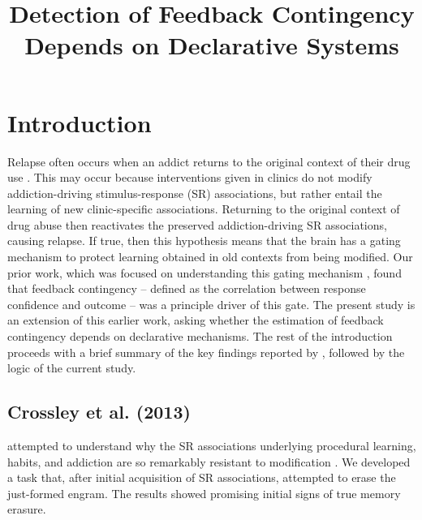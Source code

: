 \documentclass[man,apacite,draftfirst]{apa6} \usepackage{amsmath}
\title{Detection of Feedback Contingency Depends on Declarative Systems}
\begin{document}
\maketitle

\section*{Introduction}
Relapse often occurs when an addict returns to the original context of their
drug use \cite{higgins_outpatient_1995}. This may occur because interventions
given in clinics do not modify addiction-driving stimulus-response (SR)
associations, but rather entail the learning of new clinic-specific
associations. Returning to the original context of drug abuse then reactivates
the preserved addiction-driving SR associations, causing relapse. If true, then
this hypothesis means that the brain has a gating mechanism to protect learning
obtained in old contexts from being modified. Our prior work, which was focused
on understanding this gating mechanism \cite{crossley_erasing_2013}, found that
feedback contingency -- defined as the correlation between response confidence
and outcome -- was a principle driver of this gate. The present study is an
extension of this earlier work, asking whether the estimation of feedback
contingency depends on declarative mechanisms. The rest of the introduction
proceeds with a brief summary of the key findings reported by
\cite{crossley_erasing_2013}, followed by the logic of the current study.

\subsection*{Crossley et al. (2013)}
\cite{crossley_erasing_2013} attempted to understand why the SR associations
underlying procedural learning, habits, and addiction are so remarkably
resistant to modification \cite{crossley_erasing_2013}. We developed a task
that, after initial acquisition of SR associations, attempted to erase the
just-formed engram. The results showed promising initial signs of true memory
erasure.
\end{document}
